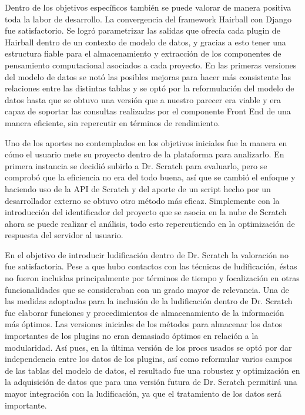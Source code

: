 \documentclass[a4paper, 12pt]{book}
\begin{document}
Dentro de los objetivos específicos también se puede valorar de manera
positiva toda la labor de desarrollo. La convergencia del framework
Hairball con Django fue satisfactorio. Se logró parametrizar las salidas
que ofrecía cada plugin de Hairball dentro de un contexto de modelo de
datos, y gracias a esto tener una estructura fiable para el almacenamiento
y extracción de los componentes de pensamiento computacional asociados
a cada proyecto. En las primeras versiones del modelo de datos se notó
las posibles mejoras para hacer más consistente las relaciones entre las
distintas tablas y se optó por la reformulación del modelo de datos hasta
que se obtuvo una versión que a nuestro parecer era viable y era capaz
de soportar las consultas realizadas por el componente Front End de una
manera eficiente, sin repercutir en términos de rendimiento.

Uno de los aportes no contemplados en los objetivos iniciales fue la
manera en cómo el usuario mete su proyecto dentro de la plataforma
para analizarlo. En primera instancia se decidió subirlo a Dr. Scratch
para evaluarlo, pero se comprobó que la eficiencia no era del todo
buena, así que se cambió el enfoque y haciendo uso de la API de Scratch
y del aporte de un script hecho por un desarrollador externo se 
obtuvo otro método más eficaz. Simplemente con la introducción del 
identificador del proyecto que se asocia en la nube de Scratch ahora
se puede realizar el análisis, todo esto repercutiendo en la optimización 
de respuesta del servidor al usuario.


En el objetivo de introducir ludificación dentro de Dr. Scratch la 
valoración no fue satisfactoria. Pese a que hubo contactos con las 
técnicas de ludificación, éstas no fueron incluidas principalmente 
por términos de tiempo y focalización en otras funcionalidades que 
se consideraban con un grado mayor de relevancia. Una de las medidas
adoptadas para la inclusión de la ludificación dentro de Dr. Scratch
fue elaborar funciones y procedimientos de almacenamiento de la 
información más óptimos. Las versiones iniciales de los métodos para 
almacenar los datos importantes de los plugins no eran demasiado 
óptimos en relación a la modularidad. Así pues, en la última versión
de los procs usados se optó por dar independencia entre los datos de 
los plugins, así como reformular varios campos de las tablas del
modelo de datos, el resultado fue una robustez y optimización en la
adquisición de datos que para una versión futura de Dr. Scratch 
permitirá una mayor integración con la ludificación, ya que el 
tratamiento de los datos será importante.
\end{document}
